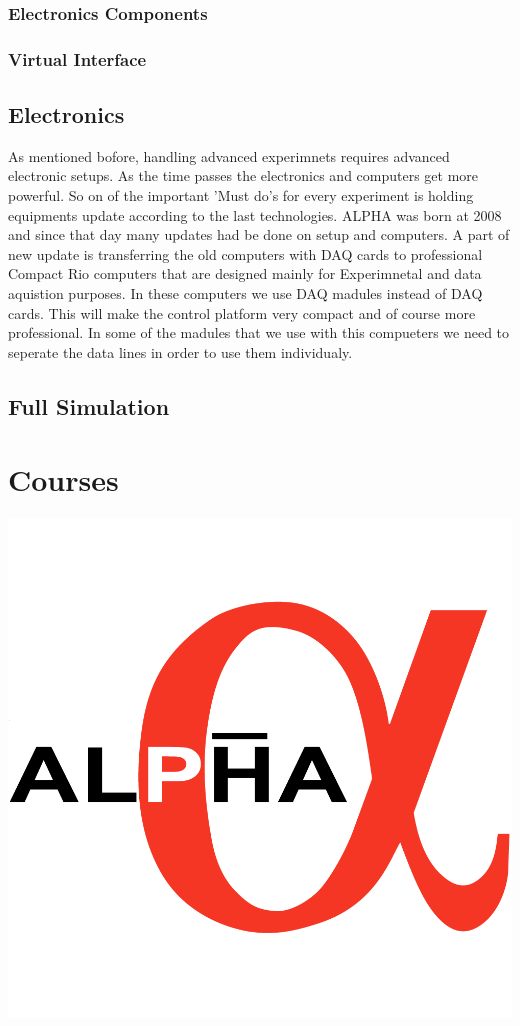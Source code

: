 \documentclass{article}
\begin{document}
\subsubsection{Electronics Components}

\subsubsection{Virtual Interface}


\subsection{Electronics}
As mentioned bofore, handling advanced experimnets requires advanced electronic setups. As the  time passes the electronics and computers get more powerful. So on of the important 'Must do's for every experiment is holding equipments update according to the last technologies. ALPHA was born at 2008 and since that day many updates had be done on setup and computers. A part of new update is transferring the old computers with DAQ cards to professional Compact Rio computers that are designed mainly for Experimnetal and data aquistion purposes. In these computers we use DAQ madules instead of DAQ cards. This will make the control platform very compact and of course more professional. In some of the madules that we use with this compueters we need to seperate the data lines in order to use them individualy. 


\subsection{Full Simulation}





\section{Courses}
\includegraphics[scale=1]{Alpha}
\end{document}
